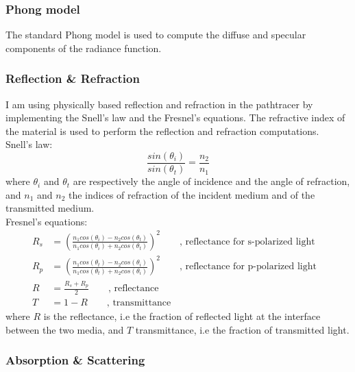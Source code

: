 \documentclass[a4paper,10pt]{article}
\begin{document}
\subsubsection{Phong model}

The standard Phong model is used to compute the diffuse and specular components of the radiance function.

\subsubsection{Reflection \& Refraction}

I am using physically based reflection and refraction in the pathtracer by implementing the Snell's law and the Fresnel's equations. The refractive index of the material is used to perform the reflection and refraction computations.\\

\noindent
Snell's law:
\begin{equation}
	\frac{sin(\theta_i)}{sin(\theta_t)} = \frac{n_2}{n_1}
\end{equation}
where $\theta_i$ and $\theta_t$ are respectively the angle of incidence and the angle of refraction, and $n_1$ and $n_2$ the indices of refraction of the incident medium and of the transmitted medium. \\

\noindent
Fresnel's equations:
\begin{equation}
\left.\begin{aligned}
    R_s &= (\frac{n_1cos(\theta_i) - n_2cos(\theta_t)}{n_1cos(\theta_i) + n_2cos(\theta_t)})^2 \qquad \text{, reflectance for s-polarized light}& \\
    R_p &= (\frac{n_1cos(\theta_t) - n_2cos(\theta_i)}{n_1cos(\theta_t) + n_2cos(\theta_i)})^2 \qquad \text{, reflectance for p-polarized light}& \\
    R   &= \frac{R_s + R_p}{2} \qquad \text{, reflectance}&\\
    T   &= 1 - R \qquad \text{, transmittance}
\end{aligned}\right.
\end{equation}
where $R$ is the reflectance, i.e the fraction of reflected light at the interface between the two media, and $T$ transmittance, i.e the fraction of transmitted light.

\subsubsection{Absorption \& Scattering}
\end{document}
